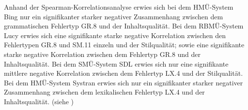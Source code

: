 
Anhand der Spearman-Korrelationsanalyse erwies sich bei dem HMÜ-System Bing nur ein signifikanter starker negativer Zusammenhang zwischen dem grammatischen Fehlertyp GR.8 und der Inhaltsqualität. Bei dem RBMÜ-System Lucy erwies sich eine signifikante starke negative Korrelation zwischen den Fehlertypen GR.8 und SM.11 einzeln und der Stilqualität; sowie eine signifikante starke negative Korrelation zwischen dem Fehlertyp GR.8 und der Inhaltsqualität. Bei dem SMÜ-System SDL erwies sich nur eine signifikante mittlere negative Korrelation zwischen dem Fehlertyp LX.4 und der Stilqualität. Bei dem HMÜ-System Systran erwies sich nur ein signifikanter starker negativer Zusammenhang zwischen dem lexikalischen Fehlertyp LX.4 und der Inhaltsqualität. (siehe )


